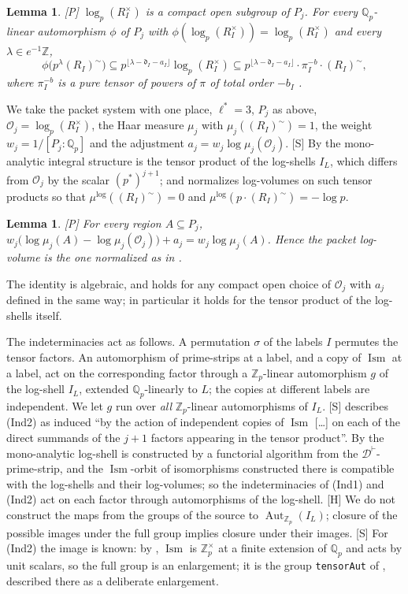 \documentclass[11pt]{article}
\theoremstyle{plain}
\newtheorem{lemma}[theorem]{Lemma}
\theoremstyle{definition}
\theoremstyle{remark}
\newcommand{\Smark}{\textup{[S]}}
\newcommand{\Pmark}{\textup{[P]}}
\newcommand{\Hmark}{\textup{[H]}}
\newcommand{\cO}{\mathcal O}
\newcommand{\Qp}[1]{\mathbb Q_{#1}}
\newcommand{\Aut}{\operatorname{Aut}}
\newcommand{\Ism}{\operatorname{Ism}}
\newcommand{\tI}{(R_I)^{\sim}}
\begin{document}
\begin{lemma}\label{l:shell}
\Pmark{} $\log_p(R_I^\times)$ is a compact open subgroup of $P_j$. For every
$\mathbb Q_p$-linear automorphism $\phi$ of $P_j$ with $\phi(\log_p(R_I^\times))=
\log_p(R_I^\times)$ and every $\lambda\in e^{-1}\mathbb Z$,
\[
\phi\bigl(p^\lambda\tI\bigr)\subseteq p^{\lfloor\lambda-\mathfrak d_I-a_I\rfloor}
\log_p(R_I^\times)\subseteq p^{\lfloor\lambda-\mathfrak d_I-a_I\rfloor}\cdot
\pi_I^{-b}\cdot\tI,
\]
where $\pi_I^{-b}$ is a pure tensor of powers of $\pi$ of total order $-b_I$
\cite[Prop.~1.2(ii)]{IUT4}.
\end{lemma}

We take the packet system with one place, $\ell^*=3$, $P_j$ as above,
$\cO_j=\log_p(R_I^\times)$, the Haar measure $\mu_j$ with $\mu_j(\tI)=1$, the weight
$w_j=1/[P_j:\Qp p]$ and the adjustment $a_j=w_j\log\mu_j(\cO_j)$. \Smark{} By
\cite[Rem.~3.9.1(i)]{IUT3} the mono-analytic integral structure is the tensor product of
the log-shells $I_L$, which differs from $\cO_j$ by the scalar $(p^*)^{j+1}$; and
\cite[Prop.~1.4(i)]{IUT4} normalizes log-volumes on such tensor products so that
$\mu^{\log}(\tI)=0$ and $\mu^{\log}(p\cdot\tI)=-\log p$.

\begin{lemma}\label{l:normalization}
\Pmark{} For every region $A\subseteq P_j$,
$w_j\bigl(\log\mu_j(A)-\log\mu_j(\cO_j)\bigr)+a_j=w_j\log\mu_j(A)$. Hence the packet
log-volume is the one normalized as in \cite[Prop.~1.4(i)]{IUT4}.
\end{lemma}

The identity is algebraic, and holds for any compact open choice of $\cO_j$ with $a_j$
defined in the same way; in particular it holds for the tensor product of the log-shells
itself.

The indeterminacies act as follows. A permutation $\sigma$ of the labels $I$ permutes the
tensor factors. An automorphism of prime-strips at a label, and a copy of $\Ism$ at a
label, act on the corresponding factor through a $\mathbb Z_p$-linear automorphism $g$ of
the log-shell $I_L$, extended $\Qp p$-linearly to $L$; the copies at different labels are
independent. We let $g$ run over \emph{all} $\mathbb Z_p$-linear automorphisms of $I_L$.
\Smark{} \cite[Thm.~3.11(i)]{IUT3} describes (Ind2) as induced ``by the action of
independent copies of $\Ism$ [\dots] on each of the direct summands of the $j+1$ factors
appearing in the tensor product''. By \cite[Prop.~1.2(vi)]{IUT3} the mono-analytic
log-shell is constructed by a functorial algorithm from the $\mathcal D^{\vdash}$-prime-strip,
and the $\Ism$-orbit of isomorphisms constructed there is compatible with the log-shells and
their log-volumes; so the indeterminacies of (Ind1) and (Ind2) act on each factor through
automorphisms of the log-shell. \Hmark{} We do not construct the maps from the groups of the
source to $\Aut_{\mathbb Z_p}(I_L)$; closure of the possible images under the full group
implies closure under their images. \Smark{} For (Ind2) the image is known: by
\cite[Proposition~9]{Fourth}, $\Ism$ is $\mathbb Z_p^\times$ at a finite extension of
$\Qp p$ and acts by unit scalars, so the full group is an enlargement; it is the group
\texttt{tensorAut} of \cite{lana}, described there as a deliberate enlargement.
\end{document}
